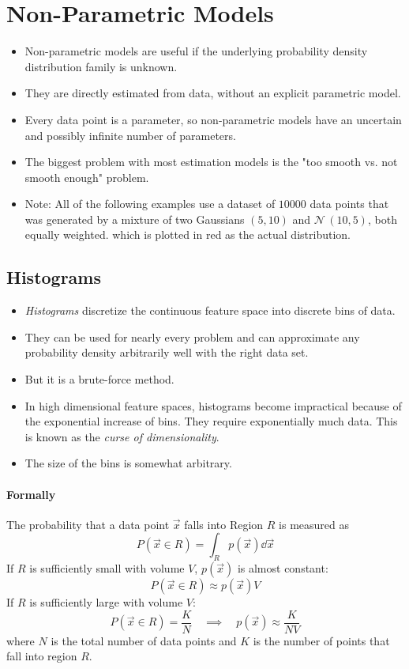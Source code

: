 \section{Non-Parametric Models}
\begin{itemize}
	\item Non-parametric models are useful if the underlying probability density distribution family is unknown.
	\item They are directly estimated from data, without an explicit parametric model.
	\item Every data point is a parameter, so non-parametric models have an uncertain and possibly infinite number of parameters.
	\item The biggest problem with most estimation models is the "too smooth vs. not smooth enough" problem.
	\item Note: All of the following examples use a dataset of \(10000\) data points that was generated by a mixture of two Gaussians \(
		(5, 10) \) and \( \mathcal{N}\,(10, 5) \), both equally weighted. which is plotted in red as the actual distribution.
\end{itemize}

\subsection{Histograms}
	\begin{itemize}
		\item \emph{Histograms} discretize the continuous feature space into discrete bins of data.
		\item They can be used for nearly every problem and can approximate any probability density arbitrarily well with the right data set.
		\item But it is a brute-force method.
		\item In high dimensional feature spaces, histograms become impractical because of the exponential increase of bins. They require exponentially much data. This is known as the \emph{curse of dimensionality}.
		\item The size of the bins is somewhat arbitrary.
	\end{itemize}

	\paragraph{Formally}
		The probability that a data point \(\vec{x}\) falls into Region \(R\) is measured as
		\begin{equation}
			P(\vec{x} \in R) = \int_R p(\vec{x}) \dd{\vec{x}}
		\end{equation}
		If \(R\) is sufficiently small with volume \(V\), \(p(\vec{x})\) is almost constant:
		\begin{equation}
			P(\vec{x} \in R) \approx p(\vec{x}) V
		\end{equation}
		If \(R\) is sufficiently large with volume \(V\):
		\begin{equation}
			P(\vec{x} \in R) = \frac{K}{N} \quad\implies\quad p(\vec{x}) \approx \frac{K}{NV}
		\end{equation}
		where \(N\) is the total number of data points and \(K\) is the number of points that fall into region \(R\).

